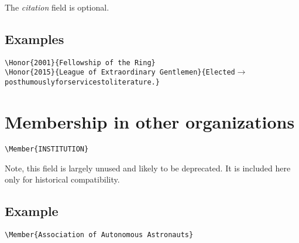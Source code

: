 \documentclass[letterpaper]{article}
\begin{document}
The \emph{citation} field is optional.

\subsection*{Examples}

\begin{alltt}
\verb|\Honor{2001}{Fellowship of the Ring}|
\verb|\Honor{2015}{League of Extraordinary Gentlemen}{Elected|\(\rightarrow\)
    posthumously for services to literature.\verb|}|
\end{alltt}


\section*{Membership in other organizations}

\begin{mdframed}
\texttt{\textbackslash Member\{INSTITUTION\}}
\end{mdframed}

Note, this field is largely unused and likely to be deprecated.  It is
included here only for historical compatibility.

\subsection*{Example}

\begin{verbatim}
\Member{Association of Autonomous Astronauts}
\end{verbatim}

\end{document}
